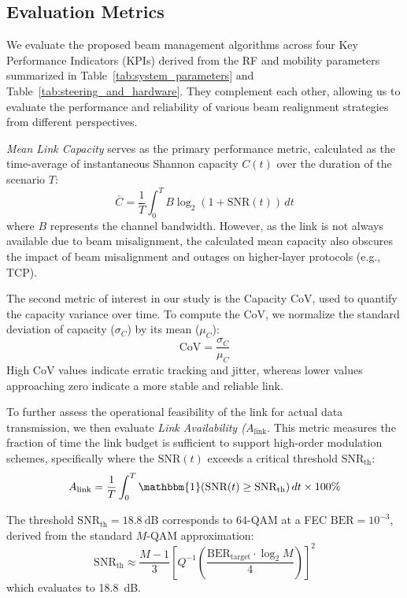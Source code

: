 \documentclass[fleqn,10pt]{wlscirep}
\begin{document}
\subsection*{Evaluation Metrics}
We evaluate the proposed beam management algorithms across four Key Performance Indicators (KPIs) derived from the RF and mobility parameters summarized in Table~\ref{tab:system_parameters} and Table~\ref{tab:steering_and_hardware}. They complement each other, allowing us to evaluate the performance and reliability of various beam realignment strategies from different perspectives.

\emph{Mean Link Capacity} serves as the primary performance metric, calculated as the time-average of instantaneous Shannon capacity $C(t)$ over the duration of the scenario $T$:
\begin{equation}
    \bar{C} = \frac{1}{T} \int_{0}^{T} B \log_2(1 + \text{SNR}(t)) \, dt
\end{equation}
where $B$ represents the channel bandwidth. However, as the link is not always available due to beam misalignment, the calculated mean capacity also obscures the impact of beam misalignment and outages on higher-layer protocols (e.g., TCP).

The second metric of interest in our study is the Capacity CoV, used to quantify the capacity variance over time.
To compute the CoV, we normalize the standard deviation of capacity ($\sigma_C$) by its mean ($\mu_C$):
\begin{equation}
    \text{CoV} = \frac{\sigma_C}{\mu_C}
\end{equation}
High CoV values indicate erratic tracking and jitter, whereas lower values approaching zero indicate a more stable and reliable link.

To further assess the operational feasibility of the link for actual data transmission, we then evaluate \emph{Link Availability ($A_{\text{link}}$}. This metric measures the fraction of time the link budget is sufficient to support high-order modulation schemes, specifically where the $\text{SNR}(t)$ exceeds a critical threshold $\text{SNR}_{\text{th}}$:
\begin{equation}
    A_{\text{link}} = \frac{1}{T} \int_{0}^{T} \mathbbm{1}\!\left(\text{SNR}(t) \geq \text{SNR}_{\text{th}}\right) dt \times 100\%
\end{equation}

The threshold $\text{SNR}_{\text{th}} = \SI{18.8}{\deci\bel}$ corresponds to 64-QAM at a FEC $\text{BER} = 10^{-3}$, derived from the standard $M$-QAM approximation\cite{Proakis2008}:
\begin{equation}
    \text{SNR}_{\text{th}} \approx \frac{M-1}{3} \left[ Q^{-1} \left( \frac{\text{BER}_{\text{target}} \cdot \log_2 M}{4} \right) \right]^2
\end{equation}
which evaluates to \SI{18.8}{\deci\bel}.
\end{document}
